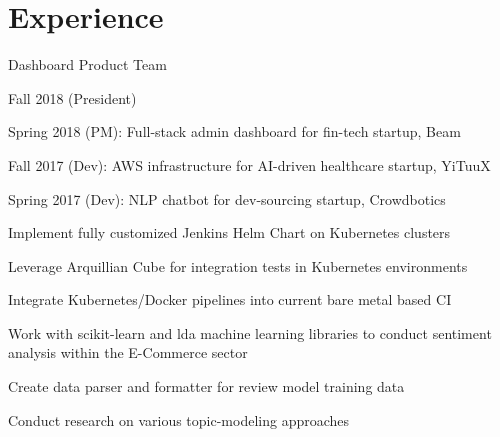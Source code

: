 \documentclass[]{deedy-resume}
\begin{document}
\begin{minipage}[t]{0.66\textwidth}


\section{Experience}
\sectionsep{}
\begin{tightemize}
  \item Dashboard Product Team
\end{tightemize}
\sectionsep{}

\begin{tightemize}
  \item Fall 2018 (President)
  \item Spring 2018 (PM): Full-stack admin dashboard for fin-tech startup, Beam
  \item Fall 2017 (Dev): AWS infrastructure for AI-driven healthcare startup, YiTuuX
  \item Spring 2017 (Dev): NLP chatbot for dev-sourcing startup, Crowdbotics
\end{tightemize}
\sectionsep{}

\sectionsep{}
\begin{tightemize}
  \item Implement fully customized Jenkins Helm Chart on Kubernetes clusters
  \item Leverage Arquillian Cube for integration tests in Kubernetes environments
  \item Integrate Kubernetes/Docker pipelines into current bare metal based CI
\end{tightemize}
\sectionsep{}

\begin{tightemize}
  \item Work with scikit-learn and lda machine learning libraries to conduct sentiment analysis within the E-Commerce sector
  \item Create data parser and formatter for review model training data
  \item Conduct research on various topic-modeling approaches
\end{tightemize}
\sectionsep{}


\end{minipage}
\end{document}
